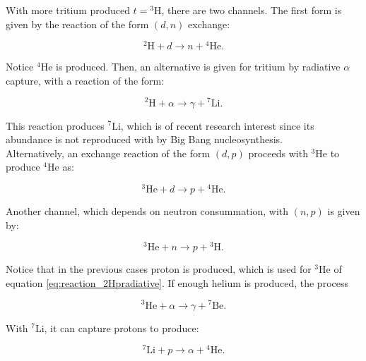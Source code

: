 \documentclass[openany]{book}
\begin{document}
 With more tritium produced $t =  \mathrm{{}^{3} H}$, there are two channels. The first form is given by the reaction of the form $(d, n)$ exchange: 
 
  \begin{equation} \label{eq:reaction_3Hd}
  	\mathrm{{}^{2}H} + d \rightarrow n + \mathrm{{}^{4}He}.
  \end{equation}

Notice $\mathrm{{}^{4}He}$ is produced. Then, an alternative is given for tritium by radiative $\alpha$ capture, with a reaction of the form: 

\begin{equation} \label{eq:reaction_3Halpha}
 	\mathrm{{}^{2}H} + \alpha \rightarrow \gamma + \mathrm{{}^{7}Li}.
\end{equation}

This reaction produces $\mathrm{{}^{7}Li}$, which is of recent research interest since its abundance is not reproduced with by Big Bang nucleosynthesis. \\

Alternatively, an exchange reaction of the form $(d, p)$ proceeds with $\mathrm{{}^{3}He}$ to produce $\mathrm{{}^{4}He}$ as: 

\begin{equation} \label{eq:reaction_3Hed}
	\mathrm{{}^{3}He} + d \rightarrow p  + \mathrm{{}^{4}He}.
	\end{equation}

Another channel, which depends on neutron consummation,  with $(n, p)$ is given by: 

\begin{equation} \label{eq:reaction_3Hen}
	\mathrm{{}^{3}He} + n \rightarrow p  + \mathrm{{}^{3}H}.
\end{equation}

Notice that in the previous cases proton is produced, which is used for $\mathrm{{}^{3}He}$ of equation \ref{eq:reaction_2Hpradiative}. If enough helium is produced, the process 

\begin{equation} \label{eq:reaction_3Healpha}
	\mathrm{{}^{3}He} + \alpha \rightarrow \gamma  + \mathrm{{}^{7}Be}.
\end{equation}

With $\mathrm{{}^{7}Li}$, it can capture protons to produce: 

\begin{equation} \label{eq:reaction_7Lip}
	\mathrm{{}^{7}Li}+ p \rightarrow \alpha  + \mathrm{{}^{4}He}.
\end{equation}
\end{document}
